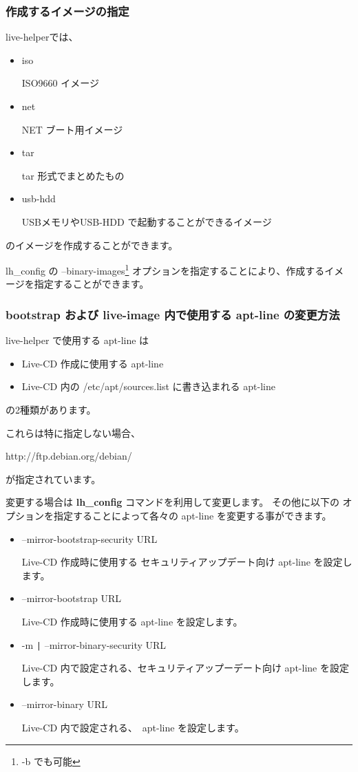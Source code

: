\documentclass[mingoth,a4paper]{jsarticle}
\begin{document}
\subsubsection{作成するイメージの指定}
live-helperでは、
\begin{itemize}
\item iso 

ISO9660 イメージ
\item net

NET ブート用イメージ 
\item tar 

tar 形式でまとめたもの

\item usb-hdd

USBメモリやUSB-HDD で起動することができるイメージ

\end{itemize}
のイメージを作成することができます。

lh\_config の --binary-images\footnote{-b でも可能} 
オプションを指定することにより、作成するイメージを指定することができます。

\begin{commandline}
\end{commandline}

\subsubsection{bootstrap および live-image 内で使用する apt-line の変更方法}
live-helper で使用する apt-line は
\begin{itemize}
\item Live-CD 作成に使用する apt-line
\item Live-CD 内の /etc/apt/sources.list に書き込まれる apt-line
\end{itemize}
の2種類があります。

これらは特に指定しない場合、
\begin{commandline}
http://ftp.debian.org/debian/
\end{commandline}
が指定されています。

変更する場合は {\bf lh\_config} コマンドを利用して変更します。
その他に以下の オプションを指定することによって各々の apt-line を変更する事ができます。

\begin{itemize}
\item --mirror-bootstrap-security URL

Live-CD 作成時に使用する セキュリティアップデート向け apt-line を設定します。 
\item --mirror-bootstrap URL

Live-CD 作成時に使用する apt-line を設定します。
\item -m \verb+|+ --mirror-binary-security URL

Live-CD 内で設定される、セキュリティアップーデート向け apt-line を設定します。
\item --mirror-binary URL

Live-CD 内で設定される、　apt-line を設定します。
\end{itemize}
\end{document}
